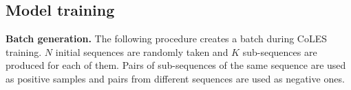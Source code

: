 \documentclass[sigconf, anonymous]{acmart}
\begin{document}
\subsection{Model training} \label{sec-training}

\textbf{Batch generation.} The following procedure creates a batch during CoLES training. $N$ initial sequences are randomly taken and $K$ sub-sequences are produced for each of them. Pairs of sub-sequences of the same sequence are used as positive samples and pairs from different sequences are used as negative ones.

\end{document}
